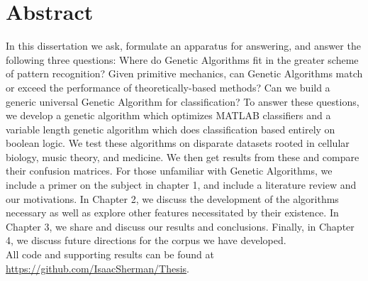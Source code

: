 \chapter*{Abstract}\label{ch:abstract}
In this dissertation we ask, formulate an apparatus for answering, and answer the following three questions: Where do Genetic Algorithms fit in the greater scheme of pattern recognition?  Given primitive mechanics, can Genetic Algorithms match or exceed the performance of theoretically-based methods?  Can we build a generic universal Genetic Algorithm for classification?  To answer these questions, we develop a genetic algorithm which optimizes MATLAB classifiers and a variable length genetic algorithm which does classification based entirely on boolean logic.  We test these algorithms on disparate datasets rooted in cellular biology, music theory, and medicine.  We then get results from these and compare their confusion matrices.  For those unfamiliar with Genetic Algorithms, we include a primer on the subject in chapter 1, and include a literature review and our motivations.  In Chapter 2, we discuss the development of the algorithms necessary as well as explore other features necessitated by their existence.  In Chapter 3, we share and discuss our results and conclusions.  Finally, in Chapter 4, we  discuss future directions for the corpus we have developed.  \\All code and supporting results can be found at \url{https://github.com/IsaacSherman/Thesis}.